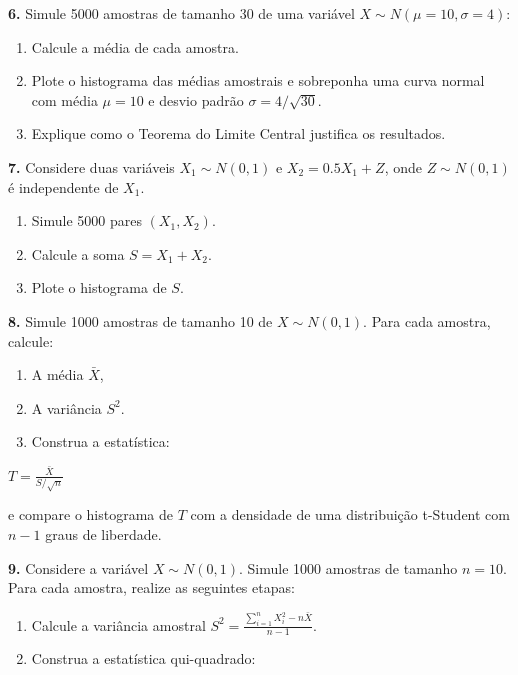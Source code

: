 \documentclass[
]{book}
\begin{document}
\textbf{6.} Simule 5000 amostras de tamanho 30 de uma variável \(X \sim N(\mu=10, \sigma=4)\):

\begin{enumerate}
\def\labelenumi{(\alph{enumi})}
\item
  Calcule a média de cada amostra.
\item
  Plote o histograma das médias amostrais e sobreponha uma curva normal com média \(\mu = 10\) e desvio padrão \(\sigma = 4/\sqrt{30}\).
\item
  Explique como o Teorema do Limite Central justifica os resultados.
\end{enumerate}

\textbf{7.} Considere duas variáveis \(X_1 \sim N(0, 1)\) e \(X_2 = 0.5X_1 + Z\), onde \(Z \sim N(0, 1)\) é independente de \(X_1\).

\begin{enumerate}
\def\labelenumi{(\alph{enumi})}
\item
  Simule 5000 pares \((X_1, X_2)\).
\item
  Calcule a soma \(S = X_1 + X_2\).
\item
  Plote o histograma de \(S\).
\end{enumerate}

\textbf{8.} Simule 1000 amostras de tamanho 10 de \(X \sim N(0, 1)\). Para cada amostra, calcule:

\begin{enumerate}
\def\labelenumi{(\alph{enumi})}
\item
  A média \(\bar{X}\),
\item
  A variância \(S^2\).
\item
  Construa a estatística:
\end{enumerate}

\(T = \frac{\bar{X}}{S / \sqrt{n}}\)

e compare o histograma de \(T\) com a densidade de uma distribuição t-Student com \(n-1\) graus de liberdade.

\textbf{9.} Considere a variável \(X \sim N(0, 1)\). Simule 1000 amostras de tamanho \(n = 10\). Para cada amostra, realize as seguintes etapas:

\begin{enumerate}
\def\labelenumi{(\alph{enumi})}
\item
  Calcule a variância amostral \(S^2 = \frac{\sum_{i=1}^{n}X_{i}^{2}-n \bar{X}}{n-1}\).
\item
  Construa a estatística qui-quadrado:
\end{enumerate}
\end{document}
